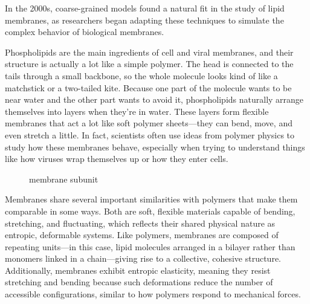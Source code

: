 \documentclass[12pt]{article}
\begin{document}
\begin{flushleft}
In the 2000s, coarse-grained models found a natural fit in the study of lipid membranes, as researchers began adapting these techniques to simulate the complex behavior of biological membranes.

Phospholipids are the main ingredients of cell and viral membranes, and their structure is actually a lot like a simple polymer. The head is connected to the tails through a small backbone, so the whole molecule looks kind of like a matchstick or a two-tailed kite. Because one part of the molecule wants to be near water and the other part wants to avoid it, phospholipids naturally arrange themselves into layers when they’re in water. These layers form flexible membranes that act a lot like soft polymer sheets—they can bend, move, and even stretch a little. In fact, scientists often use ideas from polymer physics to study how these membranes behave, especially when trying to understand things like how viruses wrap themselves up or how they enter cells.
\begin{figure}[!ht]
  \centering
  \caption{membrane subunit}
\end{figure}



Membranes share several important similarities with polymers that make them comparable in some ways. Both are soft, flexible materials capable of bending, stretching, and fluctuating, which reflects their shared physical nature as entropic, deformable systems. Like polymers, membranes are composed of repeating units—in this case, lipid molecules arranged in a bilayer rather than monomers linked in a chain—giving rise to a collective, cohesive structure. Additionally, membranes exhibit entropic elasticity, meaning they resist stretching and bending because such deformations reduce the number of accessible configurations, similar to how polymers respond to mechanical forces.



\end{flushleft}
\end{document}

